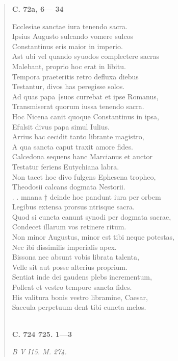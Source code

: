 \documentclass[11pt, a4paper]{report}
\begin{document}
\begin{verse}
     \marginpar{[209]} \begin{center} \textbf{C. 72a, 6— 34} \end{center}Ecclesiae sanctae iura tenendo sacra. \\ Ipsius Augusto sulcando vomere sulcos \\ Constantinus eris maior in imperio. \\ Ast ubi vel quando syuodos complectere sacras \\ Malebant, proprio hoc erat in libitu. \\ Tempora praeteritis retro defluxa diebus \\ Testantur, divos has peregisse solos. \\ Ad quas papa †suos currebat et ipse Romanus, \\ Transmiserat quorum iussa tenendo sacra. \\ Hoc Nicena canit quoque Constantinus in ipsa, \\ Efulsit divus papa simul Iulius. \\ Arrius hac cecidit tanto librante magistro, \\ A qua sancta caput traxit amore fides. \\ Calcedona sequens hanc Marcianus et auctor \\ Testatur feriens Eutychiana labra. \\ Non tacet hoc divo fulgens Ephesena tropheo, \\ Theodosii calcans dogmata Nestorii. \\ . . mnana † deinde hoc pandunt iura per orbem \\ Legibus extensa prorsus ntrisque sacra. \\  \lbrack Quod \rbrack si cuncta canunt synodi per dogmata sacrae, \\ Condecet illarum vos retinere ritum. \\ Non minor Augustus, minor est tibi neque potestas, \\ Nec ibi dissimilis imperialis apex. \\ Bissona nec absunt vobis librata talenta, \\ Velle sit aut posse alterius proprium. \\ Sentiat inde dei gaudens plebs incrementum, \\ Polleat et vestro tempore sancta fides. \\ His valitura bonis vestro libramine, Caesar, \\ Saecula perpetuum dent tibi cuncta melos. \\ 
        ﻿\pagebreak 
     \marginpar{[210]} \begin{center} \textbf{C. 724 725. 1—3} \end{center}\textit{B V I15. M. 274.} \\ 
      \end{verse}
  
\end{document}
